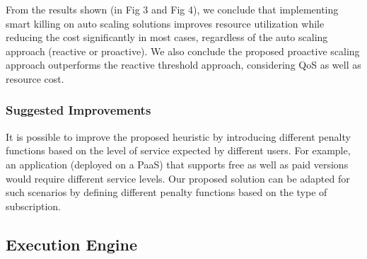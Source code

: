 From the results shown (in Fig 3 and Fig 4), we conclude that implementing smart killing on auto scaling solutions improves resource utilization while reducing the cost significantly in most cases, regardless of the auto scaling approach (reactive or proactive). We also conclude the proposed proactive scaling approach outperforms the reactive threshold approach, considering QoS as well as resource cost.

\subsubsection{Suggested Improvements}

It is possible to improve the proposed heuristic by introducing different penalty functions  based on the level of service expected by different users. For example, an application (deployed on a PaaS) that supports free as well as paid versions would require different service levels. Our proposed solution can be adapted for such scenarios by defining different penalty functions based on the type of subscription.

\subsection{Execution Engine}